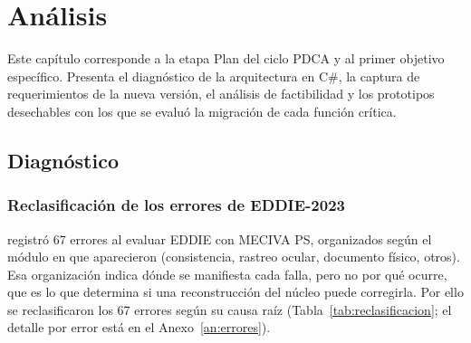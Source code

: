 \chapter{Análisis}
\label{cap:cuerpo}
\label{cap:analisis}

Este capítulo corresponde a la etapa Plan del ciclo PDCA y al primer objetivo específico. Presenta el diagnóstico de la arquitectura en C\#, la captura de requerimientos de la nueva versión, el análisis de factibilidad y los prototipos desechables con los que se evaluó la migración de cada función crítica.

\section{Diagnóstico}

\label{sec:diagnostico}

\subsection{Reclasificación de los errores de EDDIE-2023}

\citet{ibaceta2023evaluacion} registró 67 errores al evaluar EDDIE con MECIVA PS, organizados según el módulo en que aparecieron (consistencia, rastreo ocular, documento físico, otros). Esa organización indica dónde se manifiesta cada falla, pero no por qué ocurre, que es lo que determina si una reconstrucción del núcleo puede corregirla. Por ello se reclasificaron los 67 errores según su causa raíz (Tabla~\ref{tab:reclasificacion}; el detalle por error está en el Anexo~\ref{an:errores}).

